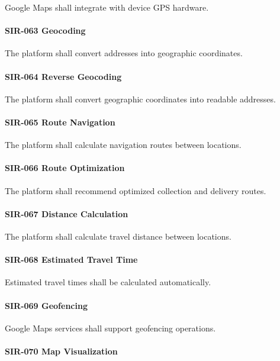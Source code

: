 Google Maps shall integrate with device GPS hardware.

\paragraph{SIR-063 Geocoding}

The platform shall convert addresses into geographic coordinates.

\paragraph{SIR-064 Reverse Geocoding}

The platform shall convert geographic coordinates into readable
addresses.

\paragraph{SIR-065 Route Navigation}

The platform shall calculate navigation routes between locations.

\paragraph{SIR-066 Route Optimization}

The platform shall recommend optimized collection and delivery routes.

\paragraph{SIR-067 Distance Calculation}

The platform shall calculate travel distance between locations.

\paragraph{SIR-068 Estimated Travel Time}

Estimated travel times shall be calculated automatically.

\paragraph{SIR-069 Geofencing}

Google Maps services shall support geofencing operations.

\paragraph{SIR-070 Map Visualization}


